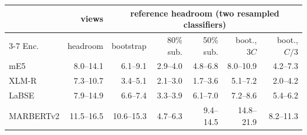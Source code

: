\begin{tabular}{@{}lrrrrrr@{}}\toprule
 & views & \multicolumn{5}{c}{reference headroom (two resampled classifiers)}\\
\cmidrule(lr){3-7}
Enc. & headroom & bootstrap & 80\% sub. & 50\% sub. & boot., $3C$ & boot., $C/3$\\\midrule
mE5 & 8.0--14.1 & 6.1--9.1 & 2.9--4.0 & 4.8--6.8 & 8.0--10.9 & 4.2--7.3\\
XLM-R & 7.3--10.7 & 3.4--5.1 & 2.1--3.0 & 1.7--3.6 & 5.1--7.2 & 2.0--4.2\\
LaBSE & 7.9--14.9 & 6.6--7.4 & 3.3--3.9 & 6.1--7.0 & 7.2--8.6 & 5.4--6.2\\
MARBERTv2 & 11.5--16.5 & 10.6--15.3 & 4.7--6.3 & 9.4--14.5 & 14.8--21.9 & 8.2--11.3\\
\bottomrule\end{tabular}

